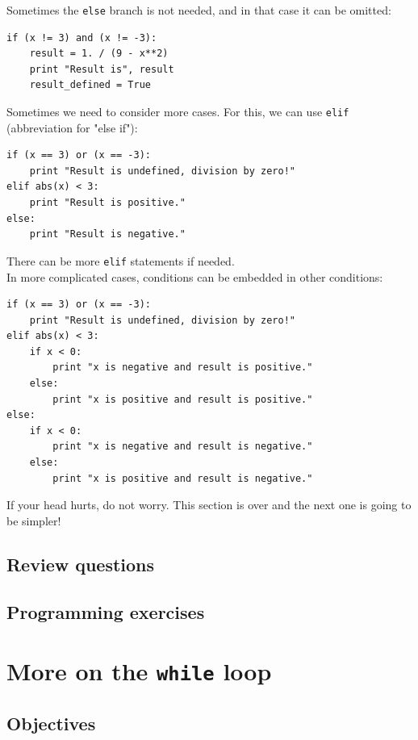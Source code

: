 \noindent
Sometimes the {\tt else} branch is not needed, and in that case it can be omitted:

\begin{verbatim}
if (x != 3) and (x != -3):
    result = 1. / (9 - x**2)
    print "Result is", result
    result_defined = True
\end{verbatim}
Sometimes we need to consider more cases. For this, we can use {\tt elif}
(abbreviation for "else if"):

\begin{verbatim}
if (x == 3) or (x == -3):
    print "Result is undefined, division by zero!"
elif abs(x) < 3:
    print "Result is positive."
else:
    print "Result is negative."
\end{verbatim}
There can be more {\tt elif} statements if needed. \\

\noindent
In more complicated cases, conditions can be embedded in other conditions:

\begin{verbatim}
if (x == 3) or (x == -3):
    print "Result is undefined, division by zero!"
elif abs(x) < 3:
    if x < 0:
        print "x is negative and result is positive."
    else: 
        print "x is positive and result is positive."
else:
    if x < 0:
        print "x is negative and result is negative."
    else: 
        print "x is positive and result is negative."
\end{verbatim}
If your head hurts, do not worry. This section is over 
and the next one is going to be simpler!

\subsection{Review questions}

\subsection{Programming exercises}


\section{More on the {\tt while} loop}\label{sec:while}

\subsection{Objectives}

